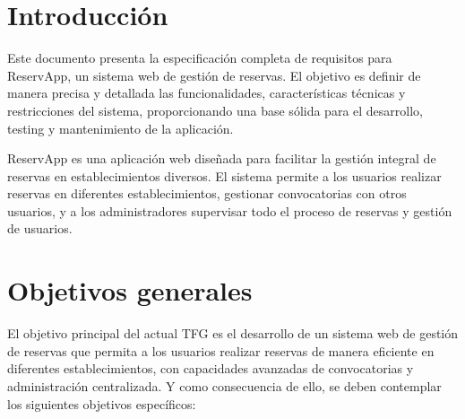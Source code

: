 
\section{Introducción}
Este documento presenta la especificación completa de requisitos para ReservApp, un sistema web de gestión de reservas. El objetivo es definir de manera precisa y detallada las funcionalidades, características técnicas y restricciones del sistema, proporcionando una base sólida para el desarrollo, testing y mantenimiento de la aplicación.

ReservApp es una aplicación web diseñada para facilitar la gestión integral de reservas en establecimientos diversos. El sistema permite a los usuarios realizar reservas en diferentes establecimientos, gestionar convocatorias con otros usuarios, y a los administradores supervisar todo el proceso de reservas y gestión de usuarios.

\section{Objetivos generales}

El objetivo principal del actual TFG es el desarrollo de un sistema web de gestión de reservas que permita a los usuarios realizar reservas de manera eficiente en diferentes establecimientos, con capacidades avanzadas de convocatorias y administración centralizada. Y como consecuencia de ello, se deben contemplar los siguientes objetivos específicos:

